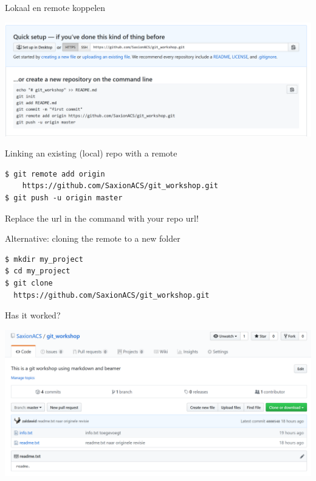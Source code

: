 \documentclass[
  11pt,
  american,
  ignorenonframetext,
  aspectratio=43,
  compress,
  xcolor=dvipsnames]{beamer}
\begin{document}
\begin{frame}{Lokaal en remote koppelen}
\protect\hypertarget{lokaal-en-remote-koppelen}{}
\begin{center}
\includegraphics[width=1.0\textwidth]{./images/github_instructions.png}
\end{center}
\end{frame}

\begin{frame}[fragile]{Linking an existing (local) repo with a remote}
\protect\hypertarget{linking-an-existing-local-repo-with-a-remote}{}
\begin{verbatim}
$ git remote add origin
    https://github.com/SaxionACS/git_workshop.git
$ git push -u origin master
\end{verbatim}

Replace the url in the command with your repo url!
\end{frame}

\begin{frame}[fragile]{Alternative: cloning the remote to a new folder}
\protect\hypertarget{alternative-cloning-the-remote-to-a-new-folder}{}
\begin{verbatim}
$ mkdir my_project
$ cd my_project
$ git clone 
  https://github.com/SaxionACS/git_workshop.git
\end{verbatim}
\end{frame}

\begin{frame}{Has it worked?}
\protect\hypertarget{has-it-worked}{}
\begin{center}
\includegraphics[width=1.0\textwidth]{./images/github_after_push.png}
\end{center}
\end{frame}
\end{document}
